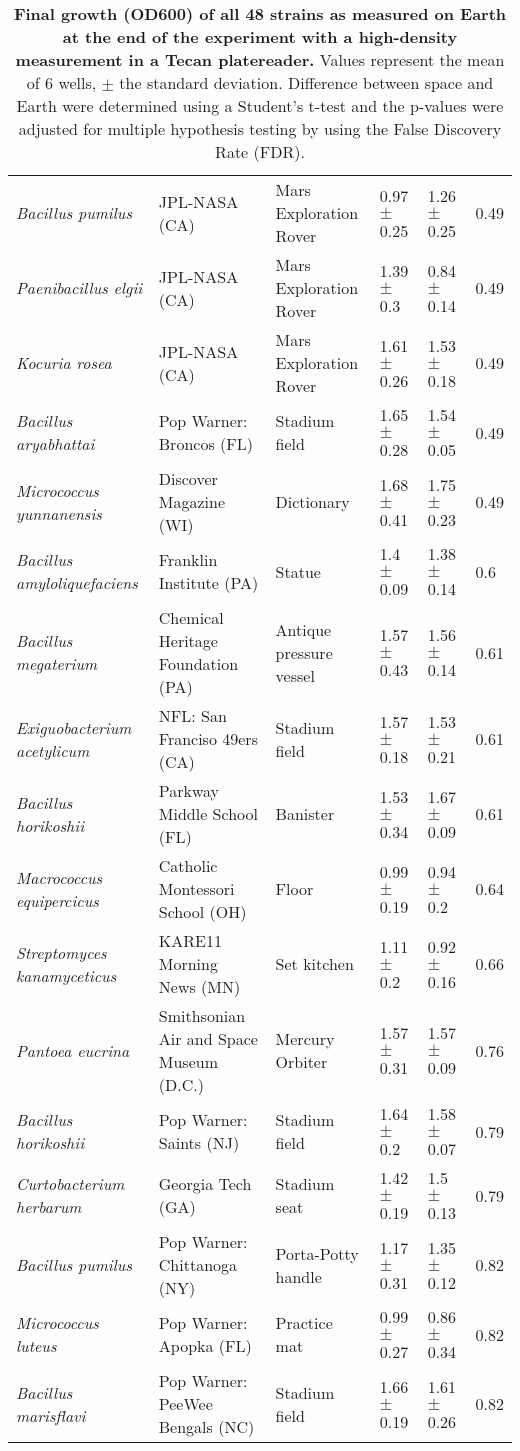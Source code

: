 \begin{table}[]
{\begin{tabular}{@{}llllll@{}}
\textit{Bacillus pumilus} & JPL-NASA (CA) & Mars Exploration Rover & 0.97 $\pm$ 0.25 & 1.26 $\pm$ 0.25 & 0.49 \\
\textit{Paenibacillus elgii} & JPL-NASA (CA) & Mars Exploration Rover & 1.39 $\pm$ 0.3 & 0.84 $\pm$ 0.14 & 0.49 \\
\textit{Kocuria rosea} & JPL-NASA (CA) & Mars Exploration Rover & 1.61 $\pm$ 0.26 & 1.53 $\pm$ 0.18 & 0.49 \\
\textit{Bacillus aryabhattai} & Pop Warner: Broncos (FL) & Stadium field & 1.65 $\pm$ 0.28 & 1.54 $\pm$ 0.05 & 0.49 \\
\textit{Micrococcus yunnanensis} & Discover Magazine (WI) & Dictionary & 1.68 $\pm$ 0.41 & 1.75 $\pm$ 0.23 & 0.49 \\
\textit{Bacillus amyloliquefaciens} & Franklin Institute (PA) & Statue & 1.4 $\pm$ 0.09 & 1.38 $\pm$ 0.14 & 0.6 \\
\textit{Bacillus megaterium} & Chemical Heritage Foundation (PA) & Antique pressure vessel & 1.57 $\pm$ 0.43 & 1.56 $\pm$ 0.14 & 0.61 \\
\textit{Exiguobacterium acetylicum} & NFL: San Franciso 49ers (CA) & Stadium field & 1.57 $\pm$ 0.18 & 1.53 $\pm$ 0.21 & 0.61 \\
\textit{Bacillus horikoshii} & Parkway Middle School (FL) & Banister & 1.53 $\pm$ 0.34 & 1.67 $\pm$ 0.09 & 0.61 \\
\textit{Macrococcus equipercicus} & Catholic Montessori School (OH) & Floor & 0.99 $\pm$ 0.19 & 0.94 $\pm$ 0.2 & 0.64 \\
\textit{Streptomyces kanamyceticus} & KARE11 Morning News (MN) & Set kitchen & 1.11 $\pm$ 0.2 & 0.92 $\pm$ 0.16 & 0.66 \\
\textit{Pantoea eucrina} & Smithsonian Air and Space Museum (D.C.) & Mercury Orbiter & 1.57 $\pm$ 0.31 & 1.57 $\pm$ 0.09 & 0.76 \\
\textit{Bacillus horikoshii} & Pop Warner: Saints (NJ) & Stadium field & 1.64 $\pm$ 0.2 & 1.58 $\pm$ 0.07 & 0.79 \\
\textit{Curtobacterium herbarum} & Georgia Tech (GA) & Stadium seat & 1.42 $\pm$ 0.19 & 1.5 $\pm$ 0.13 & 0.79 \\
\textit{Bacillus pumilus} & Pop Warner: Chittanoga (NY) & Porta-Potty handle & 1.17 $\pm$ 0.31 & 1.35 $\pm$ 0.12 & 0.82 \\
\textit{Micrococcus luteus} & Pop Warner: Apopka (FL) & Practice mat & 0.99 $\pm$ 0.27 & 0.86 $\pm$ 0.34 & 0.82 \\
\textit{Bacillus marisflavi} & Pop Warner: PeeWee Bengals (NC) & Stadium field & 1.66 $\pm$ 0.19 & 1.61 $\pm$ 0.26 & 0.82 \\ \bottomrule
\end{tabular}%
}
\caption{\textbf{Final growth (OD600) of all 48 strains as measured on Earth at the end of the experiment with a high-density measurement in a Tecan platereader.} Values represent the mean of 6 wells, $\pm$ the standard deviation. Difference between space and Earth were determined using a Student's t-test and the p-values were adjusted for multiple hypothesis testing by using the False Discovery Rate (FDR).}
\label{SG_table1}
\end{table}
